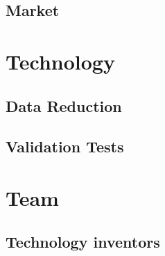 \chapter{Market} \label{ch:hendrerit}

\newpage
%
%

\part{Technology}
\newpage
\chapter{Data Reduction} \label{ch:hendrerit}

\chapter{Validation Tests} \label{ch:hendrerit}


%
%


\part{Team}
\newpage
\chapter{Technology inventors} \label{ch:hendrerit}

\newpage
%

